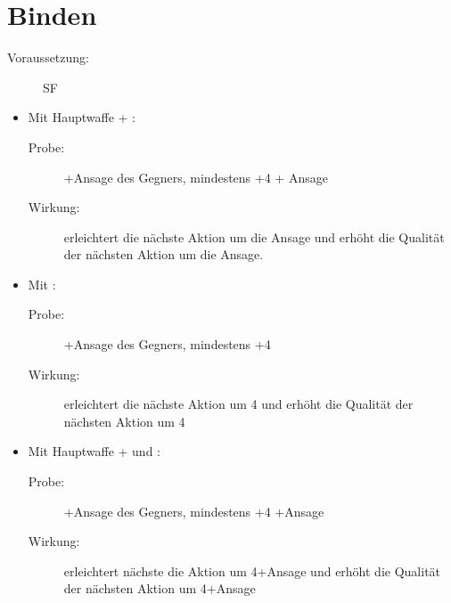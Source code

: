 \section{Binden}
\label{bPA.binden}
\begin{description}
    \item[Voraussetzung:]
        SF 
\end{description}
\begin{itemize}
    \item
        Mit Hauptwaffe + :
        \begin{description}
            \item[Probe:]
                +Ansage des Gegners, mindestens +4 + Ansage
            \item[Wirkung:]
                erleichtert die nächste Aktion um die Ansage und erhöht die Qualität der nächsten Aktion um die Ansage.
        \end{description}
    \item
        Mit :
        \begin{description}
            \item[Probe:]
                +Ansage des Gegners, mindestens +4
            \item[Wirkung:]
                erleichtert die nächste Aktion um 4 und erhöht die Qualität der nächsten Aktion um 4
        \end{description}
    \item
        Mit Hauptwaffe +  und :
        \begin{description}
            \item[Probe:]
                +Ansage des Gegners, mindestens +4 +Ansage
            \item[Wirkung:]
                erleichtert nächste die Aktion um 4+Ansage und erhöht die Qualität der nächsten Aktion um 4+Ansage
        \end{description}
\end{itemize}
